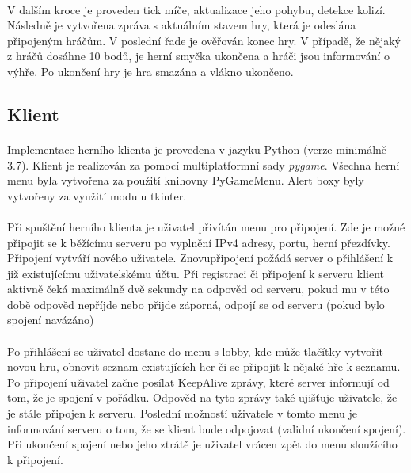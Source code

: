 \documentclass[12pt, a4paper]{article}
\begin{document}
\paragraph{}
V dalším kroce je proveden tick míče, aktualizace jeho pohybu, detekce kolizí. Následně je vytvořena zpráva s
aktuálním stavem hry, která je odeslána připojeným hráčům. V poslední řade je ověřován konec hry. V případě, že
nějaký z hráčů dosáhne 10 bodů, je herní smyčka ukončena a hráči jsou informování o výhře. Po ukončení hry je hra
smazána a vlákno ukončeno.

\newpage
\subsection{Klient}
\paragraph{}
Implementace herního klienta je provedena v jazyku Python (verze minimálně 3.7). Klient je realizován za pomocí
multiplatformní sady \textit{pygame}. Všechna herní menu byla vytvořena za použití knihovny PyGameMenu. Alert boxy
byly vytvořeny za využití modulu tkinter.

\paragraph{}
Při spuštění herního klienta je uživatel přivítán menu pro připojení. Zde je možné připojit se k běžícímu serveru po
vyplnění IPv4 adresy, portu, herní přezdívky. Připojení vytváří nového uživatele. Znovupřipojení požádá server o
přihlášení k již existujícímu uživatelskému účtu. Při registraci či připojení k serveru klient aktivně čeká maximálně
dvě sekundy na odpověd od serveru, pokud mu v této době odpověd nepříjde nebo přijde záporná, odpojí se od serveru
(pokud bylo spojení navázáno)

\paragraph{}
Po přihlášení se uživatel dostane do menu s lobby, kde může tlačítky vytvořit novou hru, obnovit seznam existujících
her či se připojit k nějaké hře k seznamu. Po připojení uživatel začne posílat KeepAlive zprávy, které server
informují od tom, že je spojení v pořádku. Odpověd na tyto zprávy také ujišťuje uživatele, že je stále připojen k
serveru. Poslední možností uživatele v tomto menu je informování serveru o tom, že se klient bude odpojovat (validní
ukončení spojení). Při ukončení spojení nebo jeho ztrátě je uživatel vrácen zpět do menu sloužícího k připojení.
\end{document}
